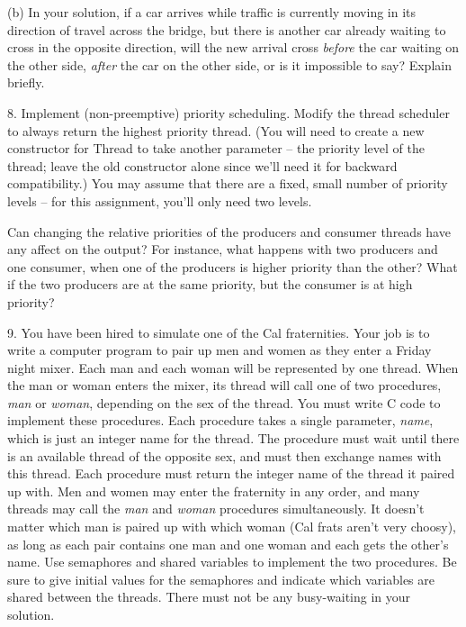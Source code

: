 \begin{description}
\begin{description}
\item{(b)} In your solution, if a car arrives while traffic is currently moving
in its direction of travel across the bridge, but there is another
car already waiting to cross in the opposite direction, will the
new arrival cross {\em before} the car waiting on the other side,
{\em after} the car on the other side, or is it impossible to
say?  Explain briefly.

\end{description}

\item{8.}
Implement (non-preemptive) priority scheduling.  
Modify the thread scheduler to always return the 
highest priority thread.  (You will need to create a new constructor 
for Thread to take another parameter -- the priority level of the thread;
leave the old constructor alone since we'll need it for backward
compatibility.)  You may assume that there are a fixed, small 
number of priority levels -- for this assignment, you'll only need two levels.

Can changing the relative priorities of the producers and consumer
threads have any affect on the output?  For instance, what happens with 
two producers and one consumer, when one of the
producers is higher priority than the other?  What if the two
producers are at the same priority, but the consumer is at high
priority?

\item{9.} You have been hired to simulate one of the Cal fraternities.
Your job is to write a computer program to pair up men and women
as they enter a Friday night mixer.  Each man and each woman will
be represented by one thread.  When the man or woman enters the
mixer, its thread will call one of two procedures, {\em man}
or {\em woman}, depending on the sex of the thread.  You must
write C code to implement these procedures.  Each procedure takes
a single parameter, {\em name}, which is just an integer name for
the thread.  The procedure must wait until there is an available
thread of the opposite sex, and must then exchange names
with this thread.
Each procedure must return the integer name of the thread
it paired up with.  Men and women may enter the fraternity
in any order, and many threads may call the {\em man} and
{\em woman} procedures simultaneously.  It doesn't matter
which man is paired up with which woman (Cal frats aren't
very choosy), as long as each pair contains one man and one woman
and each gets the other's name.  Use semaphores and shared
variables to implement the two procedures.  Be sure to
give initial values for the semaphores and indicate which
variables are shared between the threads.  There must
not be any busy-waiting in your solution.


\end{description}
